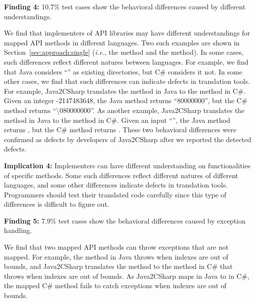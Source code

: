 \textbf{Finding 4:} 10.7\% test cases show the behavioral differences caused by different understandings.

We find that implementers of API libraries may have different understandings for mapped API methods in different languages. Two such examples are shown in Section~\ref{sec:approach:single} (\emph{i.e.}, the  method and the  method). In some cases, such differences reflect different natures between languages. For example, we find that Java considers ``\CodeIn{\textbackslash}'' as existing directories, but  C\# considers it not. In some other cases, we find that such differences can indicate defects in translation tools. For example, Java2CSharp translates the  method in Java to the  method in C\#.
Given an integer -2147483648, the Java method returns ``80000000'', but the C\# method returns ``\textbackslash080000000''. As another example, Java2CSharp translates the  method in Java to the  method in C\#. Given an input ``'', the Java method returns , but the C\# method returns . These two behavioral differences were confirmed as defects by developers of Java2CSharp after we reported the detected defects.

\textbf{Implication 4:} Implementers can have different understanding on functionalities of specific methods. Some such differences reflect different natures of different languages, and some other differences indicate  defects in translation tools. Programmers should test their translated code carefully since this type of differences is difficult to figure out.

\textbf{Finding 5:} 7.9\% test cases show the behavioral differences caused by exception handling.

We find that two mapped API methods can throw exceptions that are not mapped. For example, the  method in Java throws  when indexes are out of bounds, and Java2CSharp translates the method to the  method in C\# that throws  when indexes are out of bounds. As Java2CSharp maps  in Java to  in C\#, the mapped C\# method fails to catch exceptions when indexes are out of bounds.

